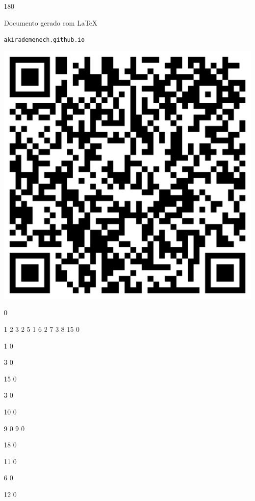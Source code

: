 \documentclass[12pt]{article}
\begin{document}
	\begin{turn}{180}	
		\begin{minipage}{\textwidth}		  
		  Documento gerado com \LaTeX			
		  
		  \texttt{akirademenech.github.io}

		  \includegraphics[height=0.3\textheight]{2e-2.pdf}

		\end{minipage}	
	\end{turn}  
		  
		\vfill  
		  
{
	0	%

	1	%
	2	%
	3	%
	2	%
	5	%
	1	%
	6	%
	2	%
	7	%
	3	%
	8	%
	15	%
	0	%

	1	%
	0	%

	3	%
	0	%

	15	%
	0	%

	3	%
	0	%

	10	%
	0	%

	9	%
	0	%
	9	%
	0	%

	18	%
	0	%

	11	%
	0	%

	6	%
	0	%

	12	%
	0	%

}	  
		    	
\end{document}
